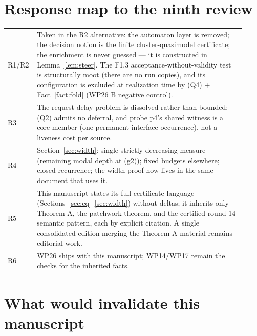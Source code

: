 \documentclass[11pt]{article}
\theoremstyle{definition}
\begin{document}
\section{Response map to the ninth review}\label{sec:resp}

\begin{center}
\begin{tabular}{p{0.08\linewidth}p{0.84\linewidth}}
\toprule
R1/R2 & Taken in the R2 alternative: the automaton layer is removed;
the decision notion is the finite cluster-quasimodel certificate; the
enrichment is never guessed --- it is constructed in
Lemma~\ref{lem:steer}.  The F1.3 acceptance-without-validity test is
structurally moot (there are no run copies), and its configuration is
excluded at realization time by (Q4) + Fact~\ref{fact:fold} (WP26 B
negative control).\\
R3 & The request-delay problem is dissolved rather than bounded: (Q2)
admits no deferral, and probe p4's shared witness is a core member
(one permanent interface occurrence), not a liveness cost per source.\\
R4 & Section~\ref{sec:width}: single strictly decreasing measure
(remaining modal depth at (g2)); fixed budgets elsewhere; closed
recurrence; the width proof now lives in the same document that uses
it.\\
R5 & This manuscript states its full certificate language
(Sections~\ref{sec:cq}--\ref{sec:width}) without deltas; it inherits
only Theorem A, the patchwork theorem, and the certified round-14
semantic pattern, each by explicit citation.  A single consolidated
edition merging the Theorem A material remains editorial work.\\
R6 & WP26 ships with this manuscript; WP14/WP17 remain the checks for
the inherited facts.\\
\bottomrule
\end{tabular}
\end{center}

\section{What would invalidate this manuscript}\label{sec:invalidate}
\end{document}
